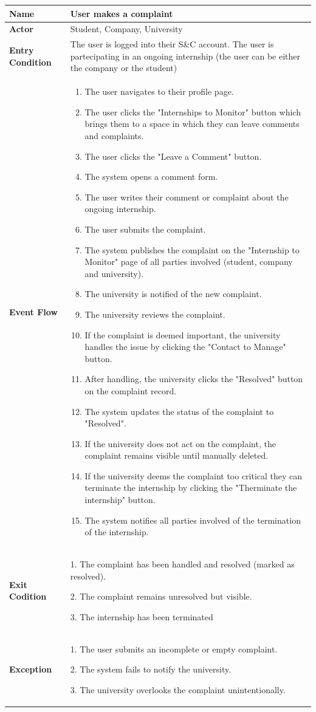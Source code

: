 \begin{longtable}{|p{}|p{}|}
\hline
\textbf{Name} &  User makes a complaint\\
\hline
\textbf{Actor} &  Student, Company, University\\
\hline
\textbf{Entry Condition} &  The user is logged into their S\&C account. The user is partecipating in an ongoing internship (the user can be either the company or the student)\\
\hline
\textbf{Event Flow} &  
\begin{enumerate}
    \item The user navigates to their profile page.
    \item The user clicks the "Internships to Monitor" button which brings them to a space in which they can leave comments and complaints.
    \item The user clicks the "Leave a Comment" button.
    \item The system opens a comment form.
    \item The user writes their comment or complaint about the ongoing internship.
    \item The user submits the complaint.
    \item The system publishes the complaint on the "Internship to Monitor" page of all parties involved (student, company and university).
    \item The university is notified of the new complaint.
    \item The university reviews the complaint.
    \item If the complaint is deemed important, the university handles the issue by clicking the "Contact to Manage" button.
    \item After handling, the university clicks the "Resolved" button on the complaint record.
    \item The system updates the status of the complaint to "Resolved".
    \item If the university does not act on the complaint, the complaint remains visible until manually deleted.
    \item If the university deems the complaint too critical they can terminate the internship by clicking the "Therminate the internship" button.
    \item The system notifies all parties involved of the termination of the internship.
\end{enumerate}
\\
\hline
\textbf{Exit Codition} & 
1. The complaint has been handled and resolved (marked as resolved).

2. The complaint remains unresolved but visible.

3. The internship has been terminated\\
\hline
\textbf{Exception} &
1. The user submits an incomplete or empty complaint.

2. The system fails to notify the university.

3. The university overlooks the complaint unintentionally.\\
\hline
\end{longtable}

